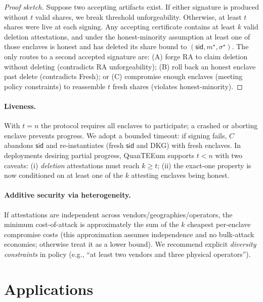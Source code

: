 \documentclass[runningheads,orivec]{llncs}
\newcommand{\prot}{\textsf{QuanTEEum}}
\newcommand{\sid}{\mathsf{sid}}
\begin{document}
\begin{proof}[Proof sketch]
Suppose two accepting artifacts exist. If either signature is produced without $t$ valid shares, we break threshold unforgeability. Otherwise, at least $t$ shares were live at each signing. Any accepting certificate contains at least $k$ valid deletion attestations, and under the honest-minority assumption at least one of those enclaves is honest and has deleted its share bound to $(\mathsf{sid},m^{\star},\sigma^{\star})$. The only routes to a second accepted signature are: (A) forge RA to claim deletion without deleting (contradicts RA unforgeability); (B) roll back an honest enclave past delete (contradicts \textsf{Fresh}); or (C) compromise enough enclaves (meeting policy constraints) to reassemble $t$ fresh shares (violates honest-minority).
\end{proof}

\paragraph{Liveness.}
With $t{=}n$ the protocol requires all enclaves to participate; a crashed or aborting enclave prevents progress. We adopt a bounded timeout: if signing fails, $C$ abandons $\sid$ and re-instantiates (fresh $\sid$ and DKG) with fresh enclaves. In deployments desiring partial progress, \prot{} supports $t<n$ with two caveats: (i) \emph{deletion} attestations must reach $k\!\ge\!t$; (ii) the exact-one property is now conditioned on at least one of the $k$ attesting enclaves being honest.

\paragraph{Additive security via heterogeneity.}
If attestations are independent across vendors/geographies/operators, the minimum cost\mbox{-}of\mbox{-}attack is approximately the sum of the $k$ cheapest per\mbox{-}enclave compromise costs (this approximation assumes independence and no bulk\mbox{-}attack economies; otherwise treat it as a lower bound). We recommend explicit \emph{diversity constraints} in policy (e.g., “at least two vendors and three physical operators”). 

\section{Applications}\label{sec:apps}
\end{document}
